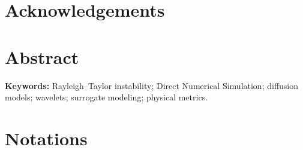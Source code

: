 \documentclass[11pt,a4paper]{report}
\begin{document}
\ClearShipoutPictureBG
\WhiteBackground


\chapter*{Acknowledgements}


\chapter*{Abstract}


\vspace{1em}
{\large\textbf{Keywords:}}
 Rayleigh--Taylor instability; Direct Numerical Simulation; diffusion models; wavelets; surrogate modeling; physical metrics.

\chapter*{Notations}

\clearpage

\tableofcontents
\clearpage








\appendix




\end{document}
